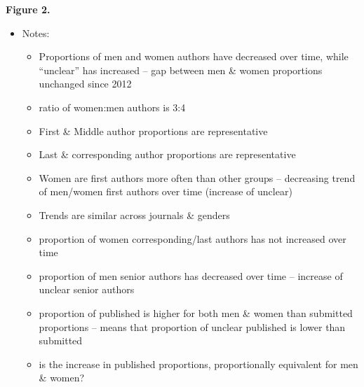 \documentclass[11pt,]{article}
\providecommand{\tightlist}{%
  \setlength{\itemsep}{0pt}\setlength{\parskip}{0pt}}
\begin{document}
\textbf{Figure 2.}

\begin{itemize}
\tightlist
\item
  Notes:

  \begin{itemize}
  \tightlist
  \item
    Proportions of men and women authors have decreased over time, while
    ``unclear'' has increased -- gap between men \& women proportions
    unchanged since 2012
  \item
    ratio of women:men authors is 3:4
  \item
    First \& Middle author proportions are representative
  \item
    Last \& corresponding author proportions are representative
  \item
    Women are first authors more often than other groups -- decreasing
    trend of men/women first authors over time (increase of unclear)
  \item
    Trends are similar across journals \& genders
  \item
    proportion of women corresponding/last authors has not increased
    over time
  \item
    proportion of men senior authors has decreased over time -- increase
    of unclear senior authors
  \item
    proportion of published is higher for both men \& women than
    submitted proportions -- means that proportion of unclear published
    is lower than submitted
  \item
    is the increase in published proportions, proportionally equivalent
    for men \& women?
  \end{itemize}
\end{itemize}
\end{document}
